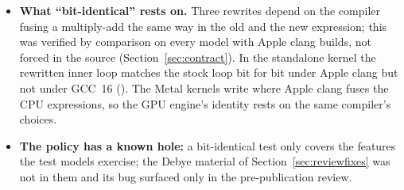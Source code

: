 \begin{itemize}
\item \textbf{What ``bit-identical'' rests on.} Three rewrites depend on the compiler fusing a multiply-add the same
  way in the old and the new expression; this was verified by comparison on every model with Apple clang builds, not
  forced in the source (Section~\ref{sec:contract}). In the standalone kernel the rewritten inner loop matches the stock
  loop bit for bit under Apple clang but not under GCC~16 ().
  The Metal kernels write  where Apple clang fuses the CPU expressions, so the GPU engine's identity rests
  on the same compiler's choices.
\item \textbf{The policy has a known hole:} a bit-identical test only covers the features the test models exercise;
  the Debye material of Section~\ref{sec:reviewfixes} was not in them and its bug surfaced only in the
  pre-publication review.
\end{itemize}

